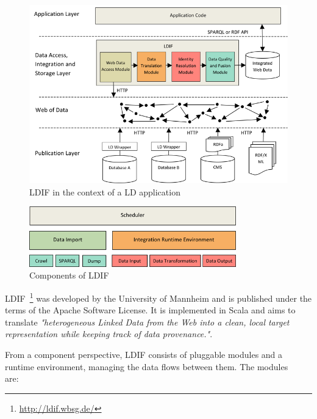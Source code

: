 \begin{figure}[htbp]
	\centering
\includegraphics[width=\textwidth]{img/ldif_context.png}
	\caption{LDIF in the context of a LD application}
	\label{ldif_context}
\end{figure}

\begin{figure}[htbp]
	\centering
\includegraphics[width=0.8\textwidth]{img/ldif_components.png}
	\caption{Components of LDIF}
	\label{ldif_components}
\end{figure}


LDIF~\footnote{\url{http://ldif.wbsg.de/}} was developed by the University of Mannheim and is published under the terms of the Apache Software License. It is implemented in Scala and aims to translate \emph{"heterogeneous Linked Data from the Web into a clean, local target representation while keeping track of data provenance."}.

From a component perspective, LDIF consists of pluggable modules and a runtime environment, managing the data flows between them. The modules are:~\cite{schultz2011ldif}~\cite{schultz2012ldif}


